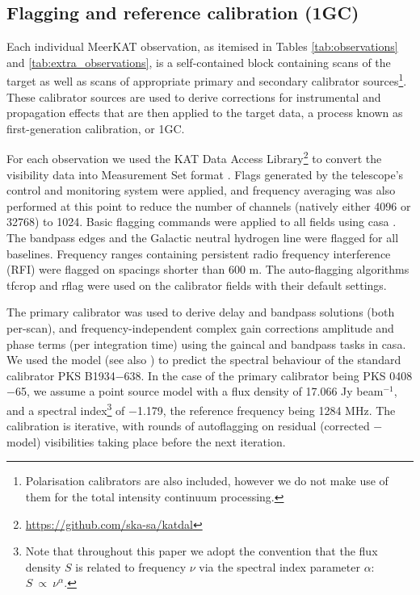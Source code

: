 \documentclass[usenatbib,usedcolumn]{mnras}
\begin{document}
\subsection{Flagging and reference calibration (1GC)}
\label{sec:processing}

Each individual MeerKAT observation, as itemised in Tables \ref{tab:observations} and \ref{tab:extra_observations}, is a self-contained block containing scans of the target as well as scans of appropriate primary and secondary calibrator sources\footnote{Polarisation calibrators are also included, however we do not make use of them for the total intensity continuum processing.}. These calibrator sources are used to derive corrections for instrumental and propagation effects that are then applied to the target data, a process known as first-generation calibration, or 1GC. 

For each observation we used the KAT Data Access Library\footnote{\url{https://github.com/ska-sa/katdal}} to convert the visibility data into Measurement Set format \citep{kemball2000}. Flags generated by the telescope's control and monitoring system were applied, and frequency averaging was also performed at this point to reduce the number of channels (natively either 4096 or 32768) to 1024. Basic flagging commands were applied to all fields using {\sc casa} \citep{mcmullin2007}. The bandpass edges and the Galactic neutral hydrogen line were flagged for all baselines. Frequency ranges containing persistent radio frequency interference (RFI) were flagged on spacings shorter than 600 m. The auto-flagging algorithms {\sc tfcrop} and {\sc rflag} were used on the calibrator fields with their default settings.

The primary calibrator was used to derive delay and bandpass solutions (both per-scan), and frequency-independent complex gain corrections amplitude and phase terms (per integration time) using the {\sc gaincal} and {\sc bandpass} tasks in {\sc casa}. We used the \citet{reynolds1994} model (see also \citealt{heywood2020b}) to predict the spectral behaviour of the standard calibrator PKS B1934$-$638. In the case of the primary calibrator being PKS 0408$-$65, we assume a point source model with a flux density of 17.066 Jy beam$^{-1}$, and a spectral index\footnote{Note that throughout this paper we adopt the convention that the flux density $S$ is related to frequency $\nu$ via the spectral index parameter $\alpha$: $S~\propto~\nu^{\alpha}$.} of $-$1.179, the reference frequency being 1284 MHz. The calibration is iterative, with rounds of autoflagging on residual (corrected $-$ model) visibilities taking place before the next iteration. 
\end{document}
